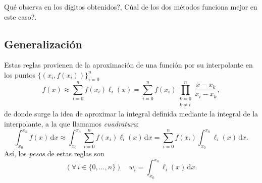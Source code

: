 \documentclass[letterpaper,11pt]{article}
\begin{document}
\textquestiondown Qu\'e observa en los digitos obtenidos?, \textquestiondown C\'ual de los dos m\'etodos funciona mejor en este caso?.

\subsection{Generalizaci\'on}
Estas reglas provienen de la aproximaci\'on de una funci\'on por su interpolante en los puntos $\{(x_i,f(x_i))\}_{i=0}^n$
$$
\displaystyle
f(x)\approx \sum_{i=0}^n f(x_i) \ell_i(x)=\sum_{i=0}^n f(x_i) \prod_{\substack{k=0\\k\neq i}}^n \frac{x-x_k}{x_i-x_k},
$$
de donde surge la idea de aproximar la integral definida mediante la integral de la interpolante, a la que llamamos \emph{cuadratura}:
$$
\displaystyle
\int_{x_0}^{x_n}
f(x)\,\mathrm{d}x \approx 
\int_{x_0}^{x_n}
\sum_{i=0}^n
f(x_i) \ell_i(x)\,\mathrm{d}x 
=
\sum_{i=0}^n
f(x_i) 
\int_{x_0}^{x_n} \ell_i(x)\,\mathrm{d}x.
$$
As\'i, los \emph{pesos} de estas reglas son
$$
(\forall\,i\in\{0,\dotsc,n\}) \quad w_i = \int_{x_0}^{x_n} \ell_i(x)\,\mathrm{d}x.
$$
\end{document}
